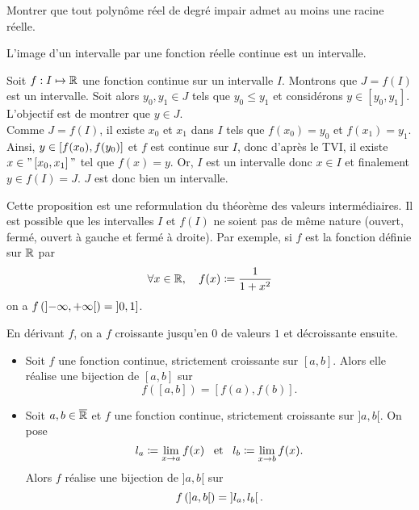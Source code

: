\documentclass{magnolia}
\begin{document}
\begin{exoUnique}
\exo Montrer que tout polynôme réel de degré impair admet au moins une racine réelle.
\end{exoUnique}

\begin{proposition}[utile=-3]
L'image d'un intervalle par une fonction réelle continue est un intervalle.
\end{proposition}

\begin{preuve}
Soit $f:I\mapsto\mathbb{R}$ une fonction continue sur un intervalle $I$. Montrons que $J=f(I)$ est un intervalle. Soit alors $y_0,y_1 \in J$ tels que $y_0\leq y_1$ et considérons $y\in [y_0,y_1]$. L'objectif est de montrer que $y\in J$.\\
Comme $J=f(I)$, il existe $x_0$ et $x_1$ dans $I$ tels que $f(x_0)=y_0$ et $f(x_1)=y_1$. Ainsi, $y\in \left[f(x_0),f(y_0)\right]$ et $f$ est continue sur $I$, donc d'après le TVI, il existe $x\in "\left[x_0,x_1\right]"$ tel que $f(x)=y$. Or, $I$ est un intervalle donc $x\in I$ et finalement $y\in f(I)=J$. $J$ est donc bien un intervalle.
\end{preuve}

\begin{remarques}
\remarque Cette proposition est une reformulation du
  théorème des valeurs intermédiaires.
\remarque Il est possible que les intervalles $I$ et
  $f(I)$ ne soient pas de même nature (ouvert, fermé, ouvert à gauche et
  fermé à droite).
  Par exemple, si $f$ est la fonction définie sur
  $\mathbb{R}$ par \[\forall x\in\mathbb{R} ,\quad f(x)\coloneqq \frac{1}{1+x^2}\]
  on a $f\left(\left]-\infty,+\infty\right[\right)=\left]0,1\right]$.
  \begin{sol}
  En dérivant $f$, on a $f$ croissante jusqu'en $0$ de valeurs $1$ et décroissante ensuite.
    \end{sol}
\end{remarques}


\begin{theoreme}[nom={Théorème de la bijection}]
\begin{itemize}
\item Soit $f$ une fonction continue, strictement croissante sur $[a,b]$. Alors elle réalise une bijection de $[a,b]$ sur \[f([a,b])=[f(a),f(b)].\]
\item Soit $a,b\in\overline{\mathbb{R}}$ et $f$ une fonction continue, strictement croissante sur $]a,b[$. On pose
\[l_a\coloneqq\lim_{x\to a} f(x) \quad\!\text{et}\quad\! l_b\coloneqq\lim_{x\to b} f(x).\]
Alors $f$ réalise une bijection de $]a,b[$ sur \[f\left(\left]a,b\right[\right)=\left]l_a,l_b\right[.\]
\end{itemize}
\end{theoreme}
\end{document}
